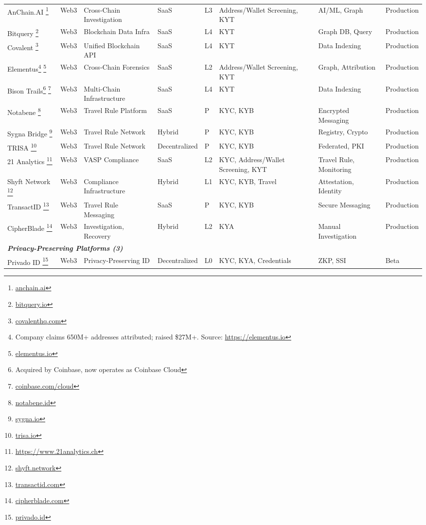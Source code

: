 \documentclass[conference,compsoc]{IEEEtran}
\begin{document}
\begin{table}[htbp]
\begin{tabularx}{\textwidth}{p{1.5cm}p{0.9cm}X p{1.1cm}p{1.2cm}p{1.1cm}X p{0.9cm}}
\hline
AnChain.AI \footnote{\url{anchain.ai}} & Web3 & Cross-Chain Investigation & SaaS & L3 & Address/Wallet Screening, KYT & AI/ML, Graph & Production \\
Bitquery \footnote{\url{bitquery.io}} & Web3 & Blockchain Data Infra & SaaS & L4 & KYT & Graph DB, Query & Production \\
Covalent \footnote{\url{covalenthq.com}} & Web3 & Unified Blockchain API & SaaS & L4 & KYT & Data Indexing & Production \\
Elementus\footnote{Company claims 650M+ addresses attributed; raised \$27M+. Source: \url{https://elementus.io}} \footnote{\url{elementus.io}} & Web3 & Cross-Chain Forensics & SaaS & L2 & Address/Wallet Screening, KYT & Graph, Attribution & Production \\
Bison Trails\footnote{Acquired by Coinbase, now operates as Coinbase Cloud} \footnote{\url{coinbase.com/cloud}} & Web3 & Multi-Chain Infrastructure & SaaS & L4 & KYT & Data Indexing & Production \\
Notabene \footnote{\url{notabene.id}} & Web3 & Travel Rule Platform & SaaS & P & KYC, KYB & Encrypted Messaging & Production \\
Sygna Bridge \footnote{\url{sygna.io}} & Web3 & Travel Rule Network & Hybrid & P & KYC, KYB & Registry, Crypto & Production \\
TRISA \footnote{\url{trisa.io}} & Web3 & Travel Rule Network & Decentralized & P & KYC, KYB & Federated, PKI & Production \\
21 Analytics \footnote{\url{https://www.21analytics.ch}} & Web3 & VASP Compliance & SaaS & L2 & KYC, Address/Wallet Screening, KYT & Travel Rule, Monitoring & Production \\
Shyft Network \footnote{\url{shyft.network}} & Web3 & Compliance Infrastructure & Hybrid & L1 & KYC, KYB, Travel & Attestation, Identity & Production \\
TransactID \footnote{\url{transactid.com}} & Web3 & Travel Rule Messaging & SaaS & P & KYC, KYB & Secure Messaging & Production \\
CipherBlade \footnote{\url{cipherblade.com}} & Web3 & Investigation, Recovery & Hybrid & L2 & KYA & Manual Investigation & Production \\
\hline
\multicolumn{8}{l}{\textit{\textbf{Privacy-Preserving Platforms (3)}}} \\
\hline
Privado ID \footnote{\url{privado.id}} & Web3 & Privacy-Preserving ID & Decentralized & L0 & KYC, KYA, Credentials & ZKP, SSI & Beta \\

\end{tabularx}
\end{table}
\end{document}

